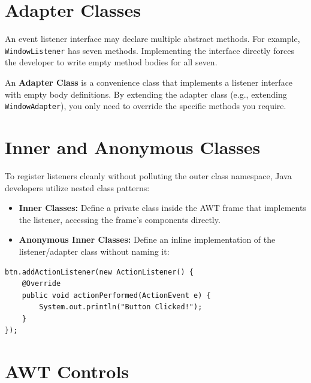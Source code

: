 \documentclass[12pt,a4paper]{article}
\begin{document}
\section{Adapter Classes}

An event listener interface may declare multiple abstract methods. For example, \texttt{WindowListener} has seven methods. Implementing the interface directly forces the developer to write empty method bodies for all seven.

\begin{tcolorbox}[defbox, title={\textbf{Adapter Class Pattern}}]
An \textbf{Adapter Class} is a convenience class that implements a listener interface with empty body definitions. By extending the adapter class (e.g., extending \texttt{WindowAdapter}), you only need to override the specific methods you require.
\end{tcolorbox}

\section{Inner and Anonymous Classes}

To register listeners cleanly without polluting the outer class namespace, Java developers utilize nested class patterns:
\begin{itemize}[leftmargin=*, itemsep=3.5pt]
  \item \textbf{Inner Classes:} Define a private class inside the AWT frame that implements the listener, accessing the frame's components directly.
  \item \textbf{Anonymous Inner Classes:} Define an inline implementation of the listener/adapter class without naming it:
\end{itemize}
\begin{verbatim}
btn.addActionListener(new ActionListener() {
    @Override
    public void actionPerformed(ActionEvent e) {
        System.out.println("Button Clicked!");
    }
});
\end{verbatim}

\section{AWT Controls}
\end{document}
